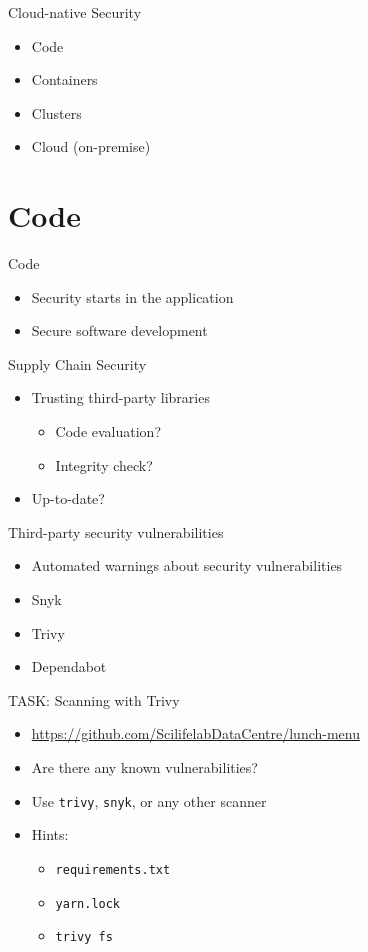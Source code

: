 \documentclass{dcpresentation}
\begin{document}
\begin{frame}{Cloud-native Security}
  \begin{itemize}
  \item Code
  \item Containers
  \item Clusters
  \item Cloud (on-premise)
  \end{itemize}
\end{frame}

\section{Code}

\begin{frame}{Code}
  \begin{itemize}
  \item Security starts in the application
  \item Secure software development
  \end{itemize}
\end{frame}

\begin{frame}{Supply Chain Security}
  \begin{itemize}
  \item Trusting third-party libraries
    \begin{itemize}
    \item Code evaluation?
    \item Integrity check?
    \end{itemize}
  \item Up-to-date?
  \end{itemize}
\end{frame}

\begin{frame}{Third-party security vulnerabilities}
  \begin{itemize}
  \item Automated warnings about security vulnerabilities
  \item Snyk
  \item Trivy
  \item Dependabot
  \end{itemize}
\end{frame}

\begin{frame}{TASK: Scanning with Trivy}
  \begin{itemize}
  \item \url{https://github.com/ScilifelabDataCentre/lunch-menu}
  \item Are there any known vulnerabilities?
  \item Use \texttt{trivy}, \texttt{snyk}, or any other scanner
  \item Hints:
    \begin{itemize}
    \item \texttt{requirements.txt}
    \item \texttt{yarn.lock}
    \item \texttt{trivy fs}
    \end{itemize}
  \end{itemize}
\end{frame}
\end{document}
